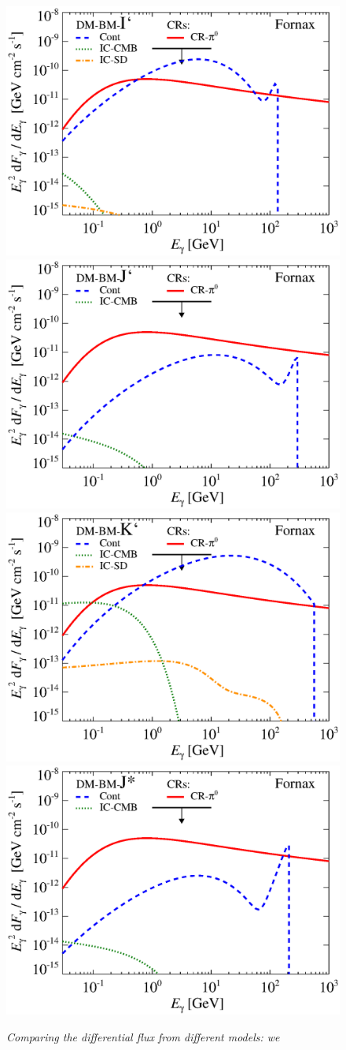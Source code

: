 \documentclass[10pt,aps,pra,reprint,amsmath,amsfonts,amssymb,showpacs,nofootinbib,floatfix]{revtex4-1}
\begin{document}
\begin{figure}
\begin{minipage}{2.0\columnwidth}
 \includegraphics[width=0.49\columnwidth]{figures/flux.BMcompI.v14.0.1deg.1.6T.SubMass.IR2.noMW.woGal.eps}
\includegraphics[width=0.49\columnwidth]{figures/flux.BMcompJ.v14.0.1deg.1.6T.SubMass.IR2.noMW.woGal.eps}
\includegraphics[width=0.49\columnwidth]{figures/flux.BMcompK.v14.0.1deg.1.6T.SubMass.IR2.noMW.woGal.eps}
\includegraphics[width=0.49\columnwidth]{figures/flux.BMcompJs.v14.0.1deg.1.6T.SubMass.IR2.noMW.woGal.eps}
\caption{\it Comparing the differential flux from different models: we
}
\end{minipage}
\end{figure}
\end{document}
